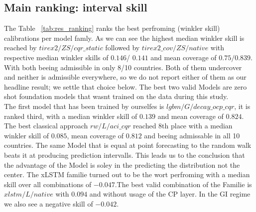 \subsection{Main ranking: interval skill}
\label{sec:res:ranking}
The Table ~\ref{tab:res_ranking} ranks the best perfroming (winkler skill) calibrations per model famly. As we can see the highest median winkler skill is reached by $tirex2/ZS/cqr\_static$ followed by $tirex2\_cov/ZS/native$ with respective median winkler skills of $0.146$/ $0.141$ and mean coverage of $0.75/0.839$. With both beeing admissible in only 8/10 countries. Both of them undercover and neither is admissible everywhere, so we do not report either of them as our headline result; we settle that choice below. The best two valid Models are zero shot foundation models that wasnt trained on the data during this study.\\
The first model that has been trained by ourselfes is $lgbm/G/decay\_ocp\_cqr$, it is ranked third, with a median winkler skill of $0.139$ and mean coverage of $0.824$. The best classical approach $rw/L/aci\_cqr$ reached 8th place with a median winkler skill of $0.085$, mean coverage of $0.812$ and beeing admissable in all 10 countries. The same Model that is equal at point forecasting to the random walk beats it at producing prediction intervalls. This leads us to the conclusion that the advantage of the Model is soley in the predicting the distribution not the center. The xLSTM familie turned out to be the wort perfroming with a median skill over all combinations of $-0.047$.The best valid combination of the Familie is $xlstm/L/native$ with $0.094$ and without usage of the CP layer. In the GI regime we also see a negative skill of $-0.042$.\\

